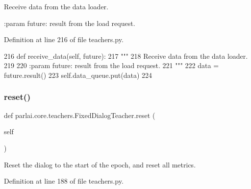 \begin{DoxyVerb}Receive data from the data loader.

:param future: result from the load request.
\end{DoxyVerb}
 

Definition at line 216 of file teachers.\+py.


\begin{DoxyCode}
216     \textcolor{keyword}{def }receive\_data(self, future):
217         \textcolor{stringliteral}{"""}
218 \textcolor{stringliteral}{        Receive data from the data loader.}
219 \textcolor{stringliteral}{}
220 \textcolor{stringliteral}{        :param future: result from the load request.}
221 \textcolor{stringliteral}{        """}
222         data = future.result()
223         self.data\_queue.put(data)
224 
\end{DoxyCode}
\mbox{\label{classparlai_1_1core_1_1teachers_1_1FixedDialogTeacher_af0e1160f17d43ace896f71c190e4e5ec}} 
\subsubsection{\texorpdfstring{reset()}{reset()}}
{\footnotesize\ttfamily def parlai.\+core.\+teachers.\+Fixed\+Dialog\+Teacher.\+reset (\begin{DoxyParamCaption}\item[{}]{self }\end{DoxyParamCaption})}

\begin{DoxyVerb}Reset the dialog to the start of the epoch, and reset all metrics.
\end{DoxyVerb}
 

Definition at line 188 of file teachers.\+py.


